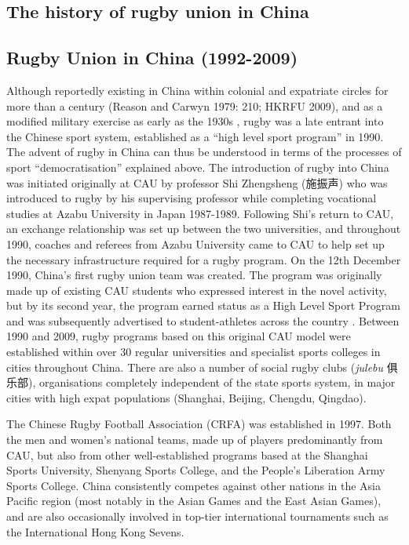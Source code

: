 {  \subsection{The history of rugby union in China}





    \subsection{Rugby Union in China (1992-2009)}
Although reportedly existing in China within colonial and expatriate circles for more than a century (Reason and Carwyn 1979: 210; HKRFU 2009), and as a modified military exercise as early as the 1930s \citep[135]{Morris2004}, rugby was a late entrant into the Chinese sport system, established as a ``high level sport program'' in 1990.  The advent of rugby in China can thus be understood in terms of the processes of sport ``democratisation'' explained above.  The introduction of rugby into China was initiated originally at CAU by professor Shi Zhengsheng (施振声) who was introduced to rugby by his
supervising professor while completing vocational studies at Azabu University in Japan 1987-1989.  Following Shi’s return to CAU, an exchange relationship was set up between the two universities, and throughout 1990, coaches and referees from Azabu University came to CAU to help set up the necessary infrastructure required for a rugby program.  On the 12th December 1990, China’s first rugby union team was created.  The program was originally made up of existing CAU students who expressed interest in the novel activity, but by its second year, the program earned status as a High Level Sport Program and was subsequently advertised to student-athletes across the country \citep[2]{Xu2010}.  Between 1990 and 2009, rugby programs based on this original CAU model were established within over 30 regular universities and specialist sports colleges in cities throughout China.  There are also a number of social rugby clubs (\textit{julebu} 俱乐部), organisations completely independent of the state sports system, in major cities with high expat populations (Shanghai, Beijing, Chengdu, Qingdao).

The Chinese Rugby Football Association (CRFA) was established in 1997. Both the men and women’s national teams, made up of players predominantly from CAU, but also from other well-established programs based at the Shanghai Sports University, Shenyang Sports College, and the People’s Liberation Army Sports College. China consistently competes against other nations in the Asia Pacific region (most notably in the Asian Games and the East Asian Games), and are also occasionally involved in top-tier international tournaments such as the International Hong Kong Sevens.

}
